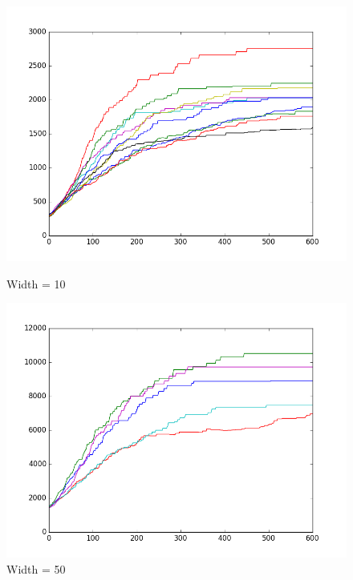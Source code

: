 \documentclass[11pt, oneside]{article}
\begin{document}
\begin{figure}[htbp]
  \centering
  \begin{minipage}{0.32\textwidth}
    \centering
    \includegraphics[width=1\textwidth]{images/cas7_width10_curve} %
    \caption*{Width = 10}
  \end{minipage}
  \hfill
  \begin{minipage}{0.32\textwidth}
    \centering
    \includegraphics[width=1\textwidth]{images/cas7_width50_curve} %
    \caption*{Width = 50}
  \end{minipage}
  \hfill
  \begin{minipage}{0.32\textwidth}
    \centering

\end{minipage}
\end{figure}
\end{document}
